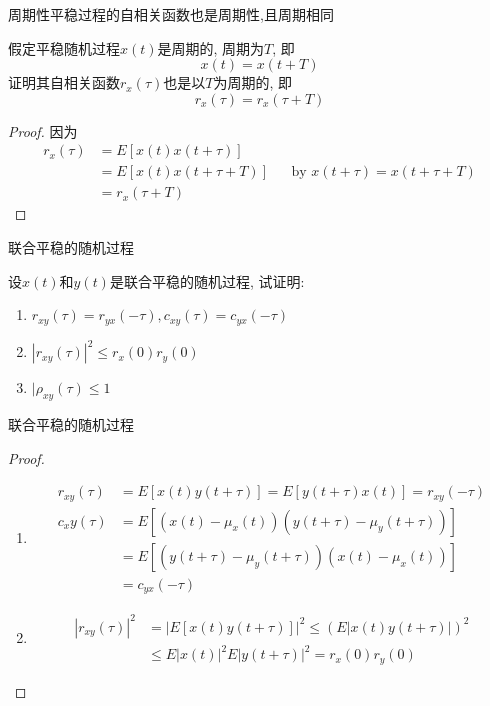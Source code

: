 \begin{frame}{周期性平稳过程的自相关函数也是周期性,且周期相同}
\begin{example}
	假定平稳随机过程$x(t)$是周期的, 周期为$T$, 即
	\[x(t)=x(t+T) \]
	证明其自相关函数$r_x(\tau)$也是以$T$为周期的, 即
	\[r_x(\tau)=r_x(\tau+T) \]
\end{example}
\begin{proof}
因为
\begin{align*}
r_x(\tau)&=E[x(t)x(t+\tau)]\\
&=E[x(t)x(t+\tau+T)]&& \text{by } x(t+\tau)=x(t+\tau+T)\\
&=r_x(\tau+T)
\end{align*}
\end{proof}
\end{frame}

\begin{frame}{联合平稳的随机过程}
\begin{example}
	设$x(t)$和$y(t)$是联合平稳的随机过程, 试证明:
	\begin{enumerate}
		\item $r_{xy}(\tau)=r_{yx}(-\tau),c_{xy}(\tau)=c_{yx}(-\tau)$
		\item $|r_{xy}(\tau)|^2\le r_x(0)r_y(0)$
		\item $|\rho_{xy}(\tau)\le 1$
	\end{enumerate}
\end{example}
\end{frame}

\begin{frame}{联合平稳的随机过程}
\begin{proof}
	\begin{enumerate}
		\item \begin{align*}
		r_{xy}(\tau)&=E[x(t)y(t+\tau)]=E[y(t+\tau)x(t)]=r_{xy}(-\tau)\\
		c_xy(\tau)&=E[(x(t)-\mu_x(t))(y(t+\tau)-\mu_y(t+\tau))]\\
		&=E[(y(t+\tau)-\mu_y(t+\tau))(x(t)-\mu_x(t))]\\
		&=c_{yx}(-\tau)
		\end{align*}
		\item \begin{align*}
		|r_{xy}(\tau)|^2&=|E[x(t)y(t+\tau)]|^2\le (E|x(t)y(t+\tau)|)^2\\
		&\le E|x(t)|^2E|y(t+\tau)|^2=r_x(0)r_y(0)
		\end{align*}
	\end{enumerate}
\end{proof}
\end{frame}

